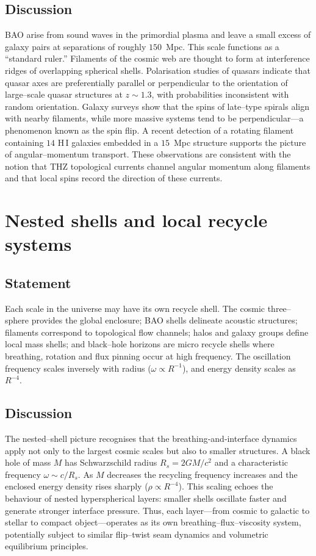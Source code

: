 \documentclass[12pt,a4paper]{article}
\begin{document}
\subsection{Discussion}
BAO arise from sound waves in the primordial plasma and leave a small excess of galaxy pairs at separations of roughly $150$~Mpc.  This scale functions as a ``standard ruler.''  Filaments of the cosmic web are thought to form at interference ridges of overlapping spherical shells.  Polarisation studies of quasars indicate that quasar axes are preferentially parallel or perpendicular to the orientation of large–scale quasar structures at $z\sim1.3$, with probabilities inconsistent with random orientation.  Galaxy surveys show that the spins of late–type spirals align with nearby filaments, while more massive systems tend to be perpendicular—a phenomenon known as the spin flip.  A recent detection of a rotating filament containing $14$ H\,I galaxies embedded in a $15$~Mpc structure supports the picture of angular–momentum transport.  These observations are consistent with the notion that THZ topological currents channel angular momentum along filaments and that local spins record the direction of these currents.

\section{Nested shells and local recycle systems}
\label{sec:nested}
\subsection{Statement}
Each scale in the universe may have its own recycle shell.  The cosmic three–sphere provides the global enclosure; BAO shells delineate acoustic structures; filaments correspond to topological flow channels; halos and galaxy groups define local mass shells; and black–hole horizons are micro recycle shells where breathing, rotation and flux pinning occur at high frequency.  The oscillation frequency scales inversely with radius ($\omega \propto R^{-1}$), and energy density scales as $R^{-4}$.

\subsection{Discussion}
The nested–shell picture recognises that the breathing‐and‐interface dynamics apply not only to the largest cosmic scales but also to smaller structures.  A black hole of mass $M$ has Schwarzschild radius $R_s=2GM/c^2$ and a characteristic frequency $\omega\sim c/R_s$.  As $M$ decreases the recycling frequency increases and the enclosed energy density rises sharply ($\rho\propto R^{-4}$).  This scaling echoes the behaviour of nested hyperspherical layers: smaller shells oscillate faster and generate stronger interface pressure.  Thus, each layer—from cosmic to galactic to stellar to compact object—operates as its own breathing–flux–viscosity system, potentially subject to similar flip–twist seam dynamics and volumetric equilibrium principles.
\end{document}
